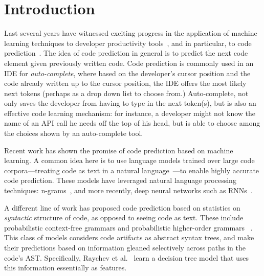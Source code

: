 \documentclass[nonacm, sigconf]{acmart}
\begin{document}
\maketitle

\section{Introduction}
\label{sec:introduction}




Last several years have witnessed exciting progress in the application of machine learning techniques to developer productivity tools~\citep{allamanis2018survey}, and in particular, to code prediction~\citep{hindle2016naturalness,raychev2016probabilistic-deep3-eth-dt,li2018code-rnn-attn,brockschmidt2018generative-graph}.  
The idea of code prediction in general is to predict the next code element given previously written code.  Code prediction is commonly used in an IDE for
\textit{auto-complete}, where based on the developer's cursor position and the code already written up to the cursor position, the IDE offers the most likely next tokens (perhaps as a drop down list to choose from.)
Auto-complete, not only saves the developer from having to type in the next token(s), but is also an effective code learning mechanism: for instance, a developer might not know the name of an API call he needs off the top of his head, but is able to choose among the choices shown by an auto-complete tool.  

Recent work has shown the promise of code prediction based on machine learning.  A common idea here is to use language models trained over large code corpora---treating code as text in a natural language~\cite{hindle2016naturalness,allamanis2018survey}---to enable highly accurate code prediction.  These models have leveraged natural language processing techniques: n-grams~\citep{hindle2016naturalness,hellendoorn2017deep}, and more recently, deep neural networks such as RNNs~\citep{parvez-etal-2018-building,li2018code-rnn-attn,liu2020modeling-stack-lstm}.

A different line of work has proposed code prediction based on statistics on \textit{syntactic} structure of code, as opposed to seeing code as text. These include probabilistic context-free grammars and probabilistic higher-order grammars ~\cite{bielik2016phog,raychev2016learning-noisy,raychev2016probabilistic-deep3-eth-dt,raychev2016probabilistic-deep3-eth-dt}.  This class of models considers code artifacts as abstract syntax trees, and make their predictions based on information gleaned selectively across paths in the code's AST.
Specifically, Raychev et al.~\cite{raychev2016probabilistic-deep3-eth-dt} learn a decision tree model that uses this information essentially as features.
\end{document}
